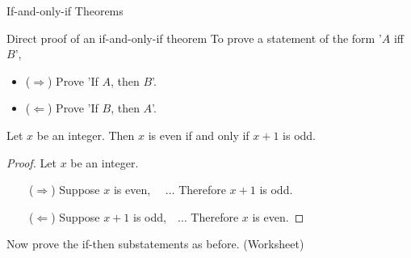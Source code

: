 \documentclass{beamer}
\begin{document}
\begin{frame}{If-and-only-if Theorems}
\begin{block}{Direct proof of an if-and-only-if theorem}
To prove a statement of the form '$A$ iff $B$',
\begin{itemize}
\item ($\Rightarrow$) Prove 'If $A$, then $B$'.
\item ($\Leftarrow$) Prove 'If $B$, then $A$'.
\end{itemize}
\end{block}\pause
\begin{theorem}
Let $x$ be an integer. Then $x$ is even if and only if $x+1$ is odd.
\end{theorem}\pause
\begin{proof}
Let $x$ be an integer.

~~~~($\Rightarrow$) Suppose $x$ is even, ~~$\dots$ Therefore $x+1$ is odd.

~~~~($\Leftarrow$) Suppose $x+1$ is odd,~~$\dots$ Therefore $x$ is even.
\end{proof}

Now prove the if-then substatements as before. (Worksheet)

\end{frame}
\end{document}

